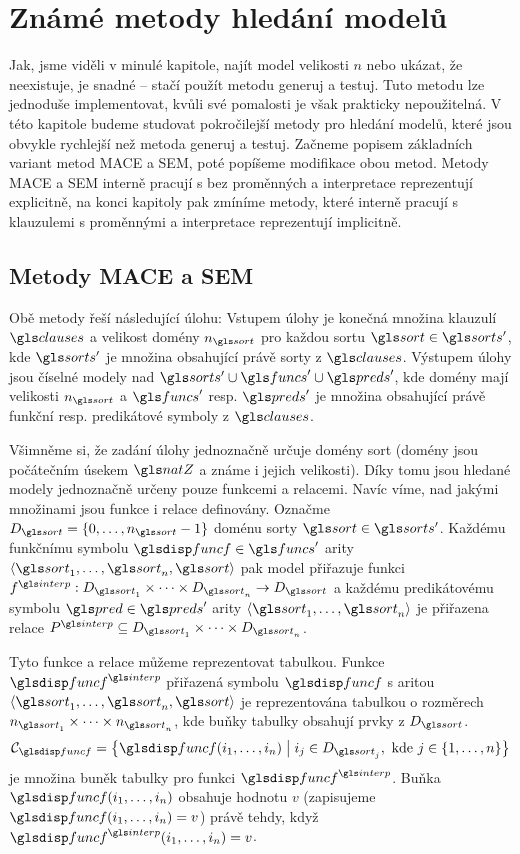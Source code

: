 \chapter{Známé metody hledání modelů}

Jak, jsme viděli v minulé kapitole, najít model
velikosti $n$ nebo ukázat, že neexistuje, je snadné --
stačí použít metodu generuj a testuj.
Tuto metodu lze jednoduše implementovat,
kvůli své pomalosti je však prakticky nepoužitelná.
V této kapitole budeme studovat pokročilejší metody
pro hledání modelů, které jsou obvykle rychlejší
než metoda generuj a testuj.
Začneme popisem základních variant metod MACE a SEM,
poté popíšeme modifikace obou metod.
Metody MACE a SEM interně pracují s  bez proměnných
a interpretace reprezentují explicitně,
na konci kapitoly pak zmíníme metody, které interně
pracují s klauzulemi s proměnnými a interpretace reprezentují
implicitně.

\section{Metody MACE a SEM}

Obě metody řeší následující úlohu:
Vstupem úlohy je konečná množina
klauzulí $\clauses$ a velikost domény $n_\sort$
pro každou sortu $\sort \in \sorts'$, kde $\sorts'$ je množina
obsahující právě sorty z $\clauses$. Výstupem úlohy jsou číselné modely
nad $\sorts' \cup \funcs' \cup \preds'$, kde domény mají velikosti
$n_\sort$ a $\funcs'$ resp. $\preds'$ je množina obsahující právě funkční
resp. predikátové symboly z $\clauses$.

Všimněme si, že zadání úlohy jednoznačně určuje domény sort
(domény jsou počátečním úsekem $\natZ$ a známe i jejich velikosti).
Díky tomu jsou hledané modely jednoznačně určeny pouze funkcemi a relacemi.
Navíc víme, nad jakými množinami jsou funkce i relace definovány.
Označme $D_\sort = \{ 0 \comdots n_\sort - 1 \}$ doménu
sorty $\sort \in \sorts'$.
Každému funkčnímu symbolu $\func \in \funcs'$ arity
$\langle \sort_1 \comdots \sort_n, \sort \rangle$ pak model přiřazuje funkci
$f^\interp : D_{\sort_1} \timdots D_{\sort_n} \to D_\sort$
a každému predikátovému symbolu $\pred \in \preds'$ arity
$\langle \sort_1 \comdots \sort_n \rangle$
je přiřazena relace $P^\interp \subseteq D_{\sort_1} \timdots D_{\sort_n}$.

\newcommand\cells{\ensuremath{\mathcal{C}}}

Tyto funkce a relace můžeme reprezentovat tabulkou.
Funkce $\func^\interp$ přiřazená symbolu $\func$
s aritou $\langle \sort_1 \comdots \sort_n, \sort \rangle$
je reprezentována tabulkou o rozměrech $n_{\sort_1} \timdots n_{\sort_n}$,
kde buňky tabulky obsahují prvky z $D_\sort$.
\[
\cells_\func = \bigl\{ \func(i_1 \comdots i_n) \bigm| i_j \in D_{\sort_j},
  \text{ kde } j \in \{ 1 \comdots n  \}  \bigr\}
\]
je množina buněk tabulky pro funkci $\func^\interp$.
Buňka $\func(i_1 \comdots i_n)$ obsahuje hodnotu $v$ (zapisujeme
$\func(i_1 \comdots i_n) = v$) právě tehdy,
když $\func^\interp(i_1 \comdots i_n) = v$.


